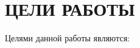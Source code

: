 \documentclass[a4paper,14pt]{article}
\begin{document}


\section{ЦЕЛИ РАБОТЫ}
Целями данной работы являются:
\end{document}
